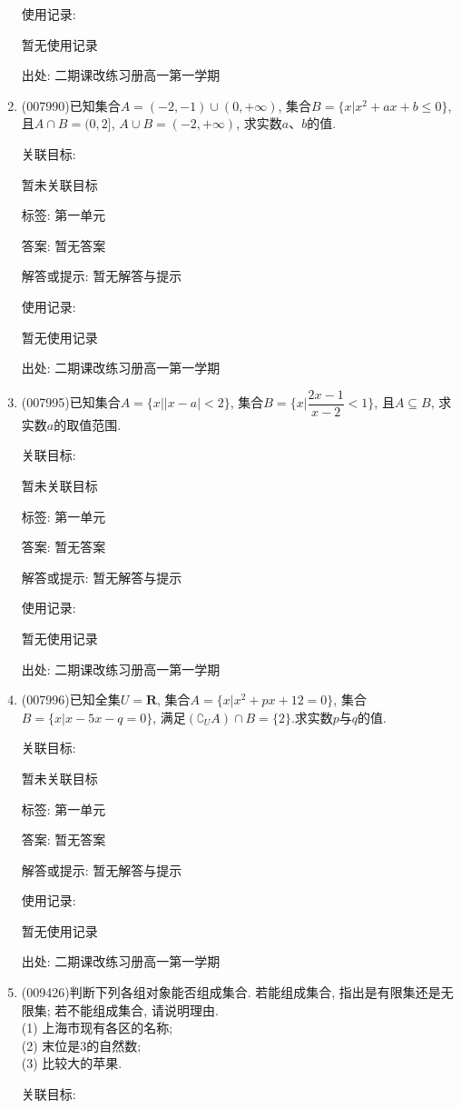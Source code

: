 \documentclass[10pt,a4paper]{article}
\begin{document}
\begin{enumerate}[1.]
使用记录:

暂无使用记录


出处: 二期课改练习册高一第一学期
\item { (007990)}已知集合$A=(-2,-1)\cup (0,+\infty)$, 集合$B=\{x|x^2+ax+b\le 0\}$, 且$A\cap B=(0,2]$, $A\cup B=(-2,+\infty)$, 求实数$a$、$b$的值.


关联目标:

暂未关联目标



标签: 第一单元

答案: 暂无答案

解答或提示: 暂无解答与提示

使用记录:

暂无使用记录


出处: 二期课改练习册高一第一学期
\item { (007995)}已知集合$A=\{x||x-a|<2\}$, 集合$B=\{x|\dfrac{2x-1}{x-2}<1\}$, 且$A\subseteq B$, 求实数$a$的取值范围.


关联目标:

暂未关联目标



标签: 第一单元

答案: 暂无答案

解答或提示: 暂无解答与提示

使用记录:

暂无使用记录


出处: 二期课改练习册高一第一学期
\item { (007996)}已知全集$U=\mathbf{R}$, 集合$A=\{x|x^2+px+12=0\}$, 集合$B=\{x|x-5x-q=0\}$, 满足$(\complement _UA)\cap B=\{2\}$.求实数$p$与$q$的值.


关联目标:

暂未关联目标



标签: 第一单元

答案: 暂无答案

解答或提示: 暂无解答与提示

使用记录:

暂无使用记录


出处: 二期课改练习册高一第一学期
\item { (009426)}判断下列各组对象能否组成集合. 若能组成集合, 指出是有限集还是无限集; 若不能组成集合, 请说明理由.\\
(1) 上海市现有各区的名称;\\
(2) 末位是$3$的自然数;\\
(3) 比较大的苹果.


关联目标:


\end{enumerate}
\end{document}
